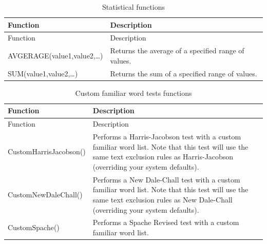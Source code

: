 \documentclass[
]{book}
\theoremstyle{definition}
\theoremstyle{definition}
\theoremstyle{definition}
\theoremstyle{definition}
\theoremstyle{remark}
\begin{document}
\begin{minipage}{\textwidth}

\begin{longtable}[]{@{}
  >{\raggedright\arraybackslash}p{}
  >{\raggedright\arraybackslash}p{}@{}}
\caption{Statistical functions}\tabularnewline
\toprule
Function & Description \\
\midrule
\endfirsthead
\toprule
Function & Description \\
\midrule
\endhead
AVGERAGE(value1,value2,\ldots) & Returns the average of a specified range of values. \\
SUM(value1,value2,\ldots) & Returns the sum of a specified range of values. \\
\bottomrule
\end{longtable}

\end{minipage}

\begin{minipage}{\textwidth}

\begin{longtable}[]{@{}
  >{\raggedright\arraybackslash}p{}
  >{\raggedright\arraybackslash}p{}@{}}
\caption{Custom familiar word tests functions}\tabularnewline
\toprule
Function & Description \\
\midrule
\endfirsthead
\toprule
Function & Description \\
\midrule
\endhead
CustomHarrisJacobson()\index{CustomHarrisJacobson()@\texttt{CustomHarrisJacobson()}} & Performs a Harris-Jacobson test with a custom familiar word list. Note that this test will use the same text exclusion rules as Harris-Jacobson (overriding your system defaults). \\
CustomNewDaleChall()\index{CustomNewDaleChall()@\texttt{CustomNewDaleChall()}} & Performs a New Dale-Chall test with a custom familiar word list. Note that this test will use the same text exclusion rules as New Dale-Chall (overriding your system defaults). \\
CustomSpache()\index{CustomSpache()@\texttt{CustomSpache()}} & Performs a Spache Revised test with a custom familiar word list. \\
\bottomrule
\end{longtable}

\end{minipage}
\end{document}

